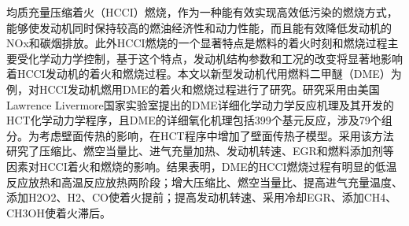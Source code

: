 \begin{abstractZh}
均质充量压缩着火（HCCI）燃烧，作为一种能有效实现高效低污染的燃烧方式，能够使发动机同时保持较高的燃油经济性和动力性能，而且能有效降低发动机的NOx和碳烟排放。此外HCCI燃烧的一个显著特点是燃料的着火时刻和燃烧过程主要受化学动力学控制，基于这个特点，发动机结构参数和工况的改变将显著地影响着HCCI发动机的着火和燃烧过程。本文以新型发动机代用燃料二甲醚（DME）为例，对HCCI发动机燃用DME的着火和燃烧过程进行了研究。研究采用由美国Lawrence Livermore国家实验室提出的DME详细化学动力学反应机理及其开发的HCT化学动力学程序，且DME的详细氧化机理包括399个基元反应，涉及79个组分。为考虑壁面传热的影响，在HCT程序中增加了壁面传热子模型。采用该方法研究了压缩比、燃空当量比、进气充量加热、发动机转速、EGR和燃料添加剂等因素对HCCI着火和燃烧的影响。结果表明，DME的HCCI燃烧过程有明显的低温反应放热和高温反应放热两阶段；增大压缩比、燃空当量比、提高进气充量温度、添加H2O2、H2、CO使着火提前；提高发动机转速、采用冷却EGR、添加CH4、CH3OH使着火滞后。
\end{abstractZh}
